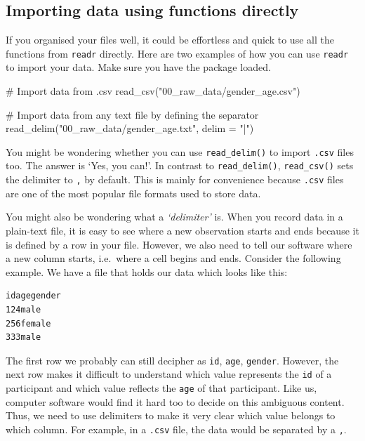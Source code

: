 \documentclass[
  letterpaper,
  DIV=11,
  numbers=noendperiod]{scrreprt}
\newenvironment{Shaded}{\begin{snugshade}}{\end{snugshade}}
\newcommand{\AttributeTok}[1]{\textcolor[rgb]{0.40,0.45,0.13}{#1}}
\newcommand{\CommentTok}[1]{\textcolor[rgb]{0.37,0.37,0.37}{#1}}
\newcommand{\FunctionTok}[1]{\textcolor[rgb]{0.28,0.35,0.67}{#1}}
\newcommand{\NormalTok}[1]{\textcolor[rgb]{0.00,0.23,0.31}{#1}}
\newcommand{\StringTok}[1]{\textcolor[rgb]{0.13,0.47,0.30}{#1}}
\begin{document}
\subsection{Importing data using functions
directly}\label{sec-importing-data-using-functions}

If you organised your files well, it could be effortless and quick to
use all the functions from \texttt{readr} directly. Here are two
examples of how you can use \texttt{readr} to import your data. Make
sure you have the package loaded.

\begin{Shaded}
\begin{Highlighting}[]
\CommentTok{\# Import data from \textquotesingle{}.csv\textquotesingle{}}
\FunctionTok{read\_csv}\NormalTok{(}\StringTok{"00\_raw\_data/gender\_age.csv"}\NormalTok{)}

\CommentTok{\# Import data from any text file by defining the separator}
\FunctionTok{read\_delim}\NormalTok{(}\StringTok{"00\_raw\_data/gender\_age.txt"}\NormalTok{, }\AttributeTok{delim =} \StringTok{"|"}\NormalTok{)}
\end{Highlighting}
\end{Shaded}

You might be wondering whether you can use \texttt{read\_delim()} to
import \texttt{.csv} files too. The answer is `Yes, you can!'. In
contrast to \texttt{read\_delim()}, \texttt{read\_csv()} sets the
delimiter to \texttt{,} by default. This is mainly for convenience
because \texttt{.csv} files are one of the most popular file formats
used to store data.

You might also be wondering what a \emph{`delimiter'} is. When you
record data in a plain-text file, it is easy to see where a new
observation starts and ends because it is defined by a row in your file.
However, we also need to tell our software where a new column starts,
i.e.~where a cell begins and ends. Consider the following example. We
have a file that holds our data which looks like this:

\begin{verbatim}
idagegender
124male
256female
333male
\end{verbatim}

The first row we probably can still decipher as \texttt{id},
\texttt{age}, \texttt{gender}. However, the next row makes it difficult
to understand which value represents the \texttt{id} of a participant
and which value reflects the \texttt{age} of that participant. Like us,
computer software would find it hard too to decide on this ambiguous
content. Thus, we need to use delimiters to make it very clear which
value belongs to which column. For example, in a \texttt{.csv} file, the
data would be separated by a \texttt{,}.
\end{document}
